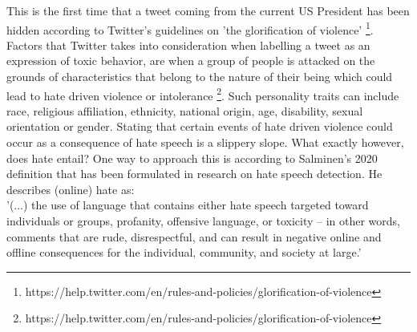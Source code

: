 \documentclass[a4paper,pdf]{article}
\begin{document}
This is the first time that a tweet coming from the current US President has been hidden according to Twitter's guidelines on 'the glorification of violence' \footnote{https://help.twitter.com/en/rules-and-policies/glorification-of-violence}. Factors that Twitter takes into consideration when labelling a tweet as an expression of toxic behavior, are when a group of people is attacked on the grounds of characteristics that belong to the nature of their being which could lead to hate driven violence or intolerance \footnote{https://help.twitter.com/en/rules-and-policies/glorification-of-violence}. Such personality traits can include race, religious affiliation, ethnicity, national origin, age, disability, sexual orientation or gender. Stating that certain events of hate driven violence could occur as a consequence of hate speech is a slippery slope. What exactly however, does hate entail? One way to approach this is according to Salminen's 2020 definition that has been formulated in research on hate speech detection. He describes (online) hate as:  \\ 

'(...) the use of language that contains either hate speech
targeted toward individuals or groups, profanity, offensive language, or toxicity –
in other words, comments that are rude, disrespectful, and can result in negative
online and offline consequences for the individual, community, and society at large.' \cite{Salminen2020DevelopingPlatforms}\\
\end{document}
